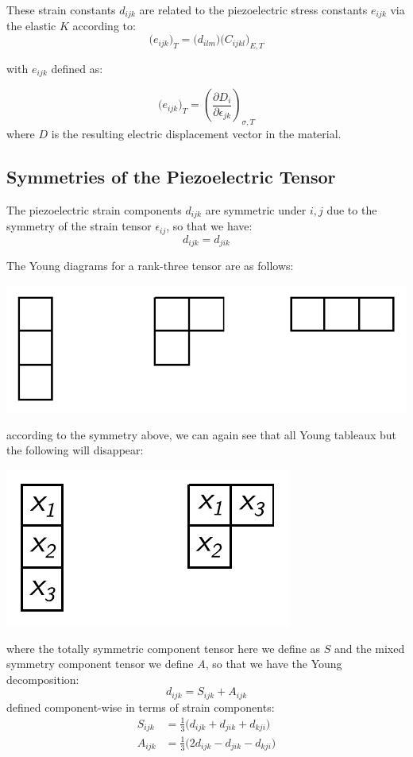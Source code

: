 \documentclass[10pt,a4paper]{article}
\begin{document}
These strain constants $d_{ijk}$ are related to the piezoelectric stress constants $e_{ijk}$ via the elastic $K$ according to:
$$
\big(e_{ijk}\big)_T=\big(d_{ilm}\big)\big(C_{ijkl}\big)_{E,T}
$$
\begin{center}
with $e_{ijk}$ defined as:
\end{center}
$$
\big(e_{ijk}\big)_{T}=\left(\frac{\partial D_{i}}{\partial \epsilon_{jk}} \right)_{\sigma, T}
$$
where $D$ is the resulting electric displacement vector in the material.

\subsection{Symmetries of the Piezoelectric Tensor}
The piezoelectric strain components $d_{ijk}$ are symmetric under $i,j$ due to the symmetry of the strain tensor $\epsilon_{ij}$, so that we have:
$$
d_{ijk}=d_{jik}
$$

The Young diagrams for a rank-three tensor are as follows:
\begin{center}
\includegraphics[scale=0.7]{youngdiagrams3.pdf}
\end{center}
according to the symmetry above, we can again see that all Young tableaux but the following will disappear:
\begin{center}
\includegraphics[scale=0.7]{piezo_young.pdf}
\end{center}
where the totally symmetric component tensor here we define as $S$ and the mixed symmetry component tensor we define $A$, so that we have the Young decomposition:
$$
d_{ijk} = S_{ijk}+A_{ijk}
$$
defined component-wise in terms of strain components:
\begin{align*}
S_{ijk}&=\frac{1}{3}\big(d_{ijk}+d_{jik}+d_{kji}\big)\\
A_{ijk}&=\frac{1}{3}\big(2d_{ijk}-d_{jik}-d_{kji}\big)\\
\end{align*}
\end{document}

